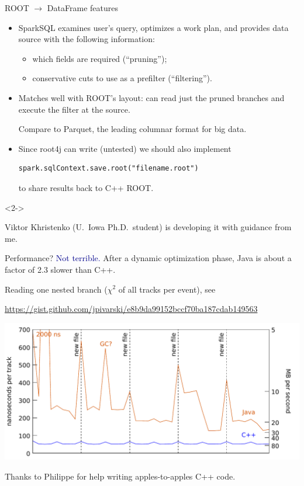 \documentclass{beamer}
\begin{document}
\begin{frame}[fragile]{ROOT $\to$ DataFrame features}
\vspace{0.5 cm}
\begin{itemize}\setlength{\itemsep}{0.25 cm}
\item SparkSQL examines user's query, optimizes a work plan, and provides data source with the following information:
\begin{itemize}
\item which fields are required (``pruning'');
\item conservative cuts to use as a prefilter (``filtering'').
\end{itemize}

\item Matches well with ROOT's layout: can read just the pruned branches and execute the filter at the source.

\vspace{0.25 cm}
Compare to Parquet, the leading columnar format for big data.

\item Since root4j can write (untested) we should also implement 
\begin{verbatim}
spark.sqlContext.save.root("filename.root")
\end{verbatim}
to share results back to C++ ROOT.
\end{itemize}

\begin{uncoverenv}<2->
\begin{center}
\Large Viktor Khristenko (U.\ Iowa Ph.D.\ student) is developing it with guidance from me.
\end{center}
\end{uncoverenv}
\end{frame}

\begin{frame}{Performance?}
\vspace{0.5 cm}
{\Large \textcolor{darkblue}{Not terrible.} \normalsize After a dynamic optimization phase, Java is about a factor of 2.3 slower than C++.}

\vspace{0.25 cm}
\small
Reading one nested branch ($\chi^2$ of all tracks per event), see

\textcolor{blue}{\tiny \url{https://gist.github.com/jpivarski/e8b9da99152bccf70ba187cdab149563}}

\includegraphics[width=\linewidth]{performance.pdf}

\normalsize
Thanks to Philippe for help writing apples-to-apples C++ code.
\end{frame}
\end{document}
